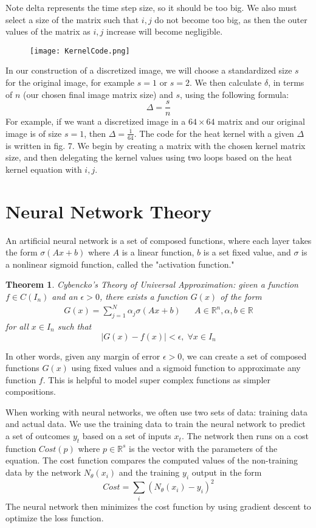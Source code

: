 \documentclass[12pt]{article}
\theoremstyle{plain}
\newtheorem{theorem}{Theorem}
\theoremstyle{definition}
\theoremstyle{remark}
\newcommand{\R}{\mathbb{R}}                %
\begin{document}
  Note delta represents the time step size, so it should be too big. We also must select a size of the matrix such that $i, j$ do not become too big, as then the outer values of the matrix as $i, j$ increase will become negligible. 
  \begin{figure}[ht]
\centering
\caption{}
\texttt{[image: KernelCode.png]}
\end{figure}
  In our construction of a discretized image, we will choose a standardized size $s$ for the original image, for example $s=1$ or $s=2$. We then calculate $\delta$, in terms of $n$ (our chosen final image matrix size) and $s$, using the following formula: 
  $$\Delta = \frac{s}{n}$$
  For example, if we want a discretized image in a $64 \times 64$ matrix and our original image is of size $s=1$, then $\Delta= \frac{1}{64}$. 
  The code for the heat kernel with a given $\Delta$ is written in fig. 7.
  We begin by creating a matrix with the chosen kernel matrix size, and then delegating the kernel values using two loops based on the heat kernel equation with $i, j$. 


\section{Neural Network Theory}
 An artificial neural network is a set of composed functions, where each layer takes the form $\sigma(Ax+ b)$ where $A$ is a linear function, $b$ is a set fixed value, and $\sigma$ is a nonlinear sigmoid function, called the "activation function." 
\begin{theorem}  Cybencko's Theory of Universal Approximation: given a function $f \in C(I_n)$  and an $\epsilon >0$, there exists a function $G(x)$ of the form \begin{align*}
    G(x) = \sum_{j=1}^N \alpha_j \sigma (Ax + b) && A \in \R^n, \alpha, b \in \R
\end{align*}
for all $x \in I_n$ such that $$|G(x)-f(x)|<\epsilon, \; \forall x \in I_n$$

\end{theorem}
In other words, given any margin of error $\epsilon >0$, we can create a set of composed functions $G(x)$ using fixed values and a sigmoid function to approximate any function $f$. This is helpful to model super complex functions as simpler compositions.  

When working with neural networks, we often use two sets of data: training data and actual data. We use the training data to train the neural network to predict a set of outcomes $y_t$ based on a set of inputs $x_t$.  The network then runs on a cost function $Cost(p)$ where $p\in \R^s$ is the vector with the parameters of the equation. The cost function compares the computed values of the non-training data by the network $N_{\theta}(x_i)$ and the training $y_i$ output in the form 
$$Cost = \sum_i (N_{\theta}(x_i) - y_i)^2$$
The neural network then minimizes the cost function by using gradient descent to optimize the loss function. 
\end{document}
